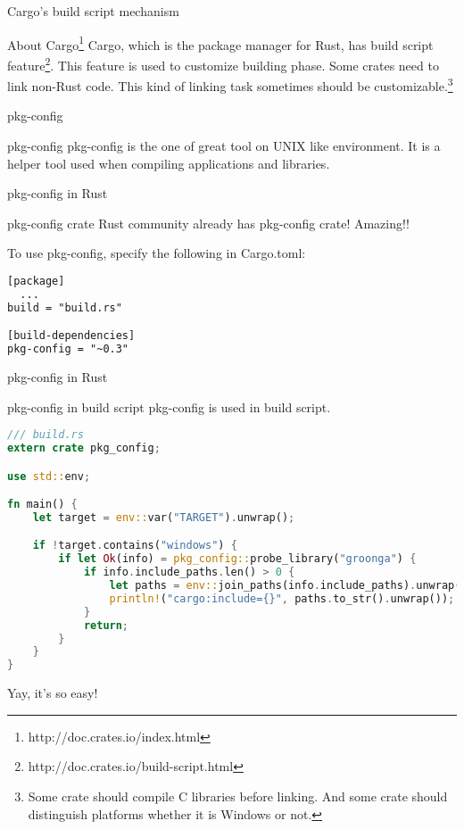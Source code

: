 \documentclass[12pt, unicode]{beamer}
\begin{document}
\begin{frame}{Cargo's build script mechanism}
\begin{block}{About Cargo\footnote[frame]{http://doc.crates.io/index.html}}
  Cargo, which is the package manager for Rust, has build script feature\footnote[frame]{http://doc.crates.io/build-script.html}.
  \newline
  This feature is used to customize building phase.
  \newline
  Some crates need to link non-Rust code. This kind of linking task sometimes should be customizable.\footnote[frame]{Some crate should compile C libraries before linking. And some crate should distinguish platforms whether it is Windows or not.}
\end{block}
\end{frame}

\begin{frame}{pkg-config}
  \begin{block}{pkg-config}
    pkg-config is the one of great tool on UNIX like environment.
    \newline
    It is a helper tool used when compiling applications and libraries.
  \end{block}
\end{frame}

\begin{frame}[fragile]{pkg-config in Rust}
  \begin{block}{pkg-config crate}
    Rust community already has pkg-config crate! Amazing!!
  \end{block}
  To use pkg-config, specify the following in Cargo.toml:
\begin{lstlisting}[language={XML},basicstyle=\ttfamily\Small]
[package]
  ...
build = "build.rs"

[build-dependencies]
pkg-config = "~0.3"
\end{lstlisting}
\end{frame}

\newcommand\XSmall{\fontsize{7}{7}\selectfont}
\begin{frame}[fragile]{pkg-config in Rust}
  \begin{block}{pkg-config in build script}
    pkg-config is used in build script.
  \end{block}
  \begin{lstlisting}[language={Rust},basicstyle=\ttfamily\XSmall]
/// build.rs
extern crate pkg_config;

use std::env;

fn main() {
    let target = env::var("TARGET").unwrap();

    if !target.contains("windows") {
        if let Ok(info) = pkg_config::probe_library("groonga") {
            if info.include_paths.len() > 0 {
                let paths = env::join_paths(info.include_paths).unwrap();
                println!("cargo:include={}", paths.to_str().unwrap());
            }
            return;
        }
    }
}
  \end{lstlisting}
  Yay, it's so easy!
\end{frame}
\end{document}

